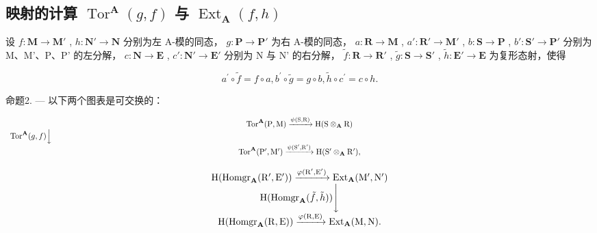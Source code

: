 \subsection{\texorpdfstring{映射的计算 \(\operatorname{Tor}^{\mathbf{A}}(g, f)\) 与 \(\operatorname{Ext}_{\mathbf{A}}(f, h)\)}{映射的计算 \textbackslash operatorname\{Tor\}\^{}\{\textbackslash mathbf\{A\}\}(g, f) 与 \textbackslash operatorname\{Ext\}\_\{\textbackslash mathbf\{A\}\}(f, h)}}

设 \(f: \mathbf{M} \to \mathbf{M}'\) , \(h: \mathbf{N}' \to \mathbf{N}\) 分别为左 A-模的同态， \(g: \mathbf{P} \to \mathbf{P}'\) 为右 A-模的同态， \(a: \mathbf{R} \to \mathbf{M}\) , \(a': \mathbf{R}' \to \mathbf{M}'\) , \(b: \mathbf{S} \to \mathbf{P}\) , \(b': \mathbf{S}' \to \mathbf{P}'\) 分别为 M、M'、P、P' 的左分解， \(c: \mathbf{N} \to \mathbf{E}\) , \(c': \mathbf{N}' \to \mathbf{E}'\) 分别为 N 与 N' 的右分解， \(\tilde{f}: \mathbf{R} \to \mathbf{R}'\) , \(\tilde{g}: \mathbf{S} \to \mathbf{S}'\) , \(\tilde{h}: \mathbf{E}' \to \mathbf{E}\) 为复形态射，使得

\[
a ^ {\prime} \circ \tilde {f} = f \circ a, b ^ {\prime} \circ \tilde {g} = g \circ b, \tilde {h} \circ c ^ {\prime} = c \circ h.
\]

命题2. --- 以下两个图表是可交换的：

\[
\begin{array}{c} \operatorname{Tor} ^ {\mathbf {A}} (\mathrm{P}, \mathrm{M}) \xrightarrow {\psi (\mathrm{S} , \mathrm{R})} \mathrm{H} (\mathrm{S} \otimes_ {\mathbf {A}} \mathrm{R}) \\ \operatorname{Tor} ^ {\mathbf {A}} (g, f) \Big \downarrow \qquad \qquad \qquad \qquad \qquad \qquad \qquad \qquad \qquad \qquad \qquad \qquad \qquad \qquad \qquad \qquad \qquad \qquad \qquad \qquad \qquad \qquad \qquad \qquad \qquad \qquad \qquad \qquad \qquad \qquad \qquad \qquad \qquad \qquad \\ \operatorname{Tor} ^ {\mathbf {A}} (\mathrm{P} ^ {\prime}, \mathrm{M} ^ {\prime}) \xrightarrow {\psi (\mathrm{S} ^ {\prime} , \mathrm{R} ^ {\prime})} \mathrm{H} (\mathrm{S} ^ {\prime} \otimes_ {\mathbf {A}} \mathrm{R} ^ {\prime})  , \end{array}
\]

\[
\begin{array}{c} \mathrm{H} (\operatorname{Homgr} _ {\mathbf {A}} (\mathrm{R} ^ {\prime}, \mathrm{E} ^ {\prime})) \xrightarrow {\varphi (\mathrm{R} ^ {\prime} , \mathrm{E} ^ {\prime})} \operatorname{Ext} _ {\mathbf {A}} (\mathrm{M} ^ {\prime}, \mathrm{N} ^ {\prime}) \\ \mathrm{H} (\operatorname{Homgr} _ {\mathbf {A}} (\tilde {f}, \tilde {h})) \Biggl \downarrow \\ \mathrm{H} (\operatorname{Homgr} _ {\mathbf {A}} (\mathrm{R}, \mathrm{E})) \xrightarrow {\varphi (\mathrm{R} , \mathrm{E})} \operatorname{Ext} _ {\mathbf {A}} (\mathrm{M}, \mathrm{N}). \end{array}
\]


